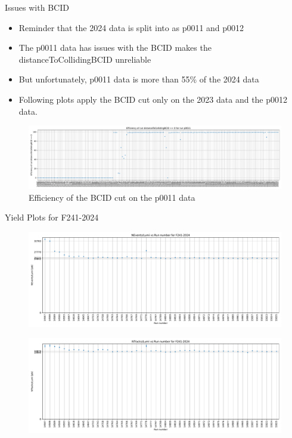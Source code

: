 \begin{frame}{Issues with BCID}
	\begin{itemize}
		\item Reminder that the 2024 data is split into as p0011 and p0012
		\item The p0011 data has issues with the BCID makes the distanceToCollidingBCID unreliable
		\item But unfortunately, p0011 data is more than 55\% of the 2024 data
		\item Following plots apply the BCID cut only on the 2023 data and the p0012 data. 
	\end{itemize}
	\begin{figure}
		\includegraphics[width=\linewidth]{./assets/BCIDEfficiency_p0011.pdf}
		\caption{Efficiency of the BCID cut on the p0011 data}
	\end{figure}

\end{frame}

\begin{frame}{Yield Plots for F241-2024}
	\begin{figure}
		\includegraphics[height=0.4\textheight]{RunwisePlots/F241-2024_NEventsbyLumi.pdf}
	\end{figure}
	\begin{figure}
		\includegraphics[height=0.4\textheight]{RunwisePlots/F241-2024_NTracksbyLumi.pdf}
	\end{figure}
\end{frame}

